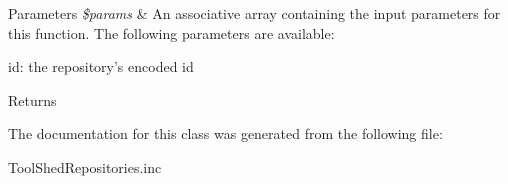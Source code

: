 \begin{DoxyParams}{Parameters}
{\em \$params} & An associative array containing the input parameters for this function. The following parameters are available\-:\\
\hline
\end{DoxyParams}

\begin{DoxyItemize}
\item id\-: the repository's encoded id
\end{DoxyItemize}

\begin{DoxyReturn}{Returns}

\end{DoxyReturn}


The documentation for this class was generated from the following file\-:\begin{DoxyCompactItemize}
\item 
Tool\-Shed\-Repositories.\-inc\end{DoxyCompactItemize}
